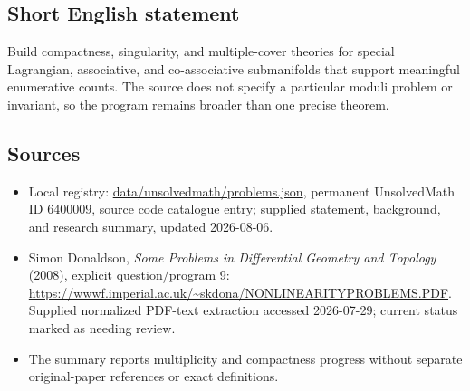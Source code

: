 \documentclass[11pt]{article}
\begin{document}
\subsection{Short English statement}
Build compactness, singularity, and multiple-cover theories for special Lagrangian, associative, and co-associative submanifolds that support meaningful enumerative counts. The source does not specify a particular moduli problem or invariant, so the program remains broader than one precise theorem.
\subsection{Sources}
\begin{itemize}
\item Local registry: \url{data/unsolvedmath/problems.json}, permanent UnsolvedMath ID \(6400009\), source code catalogue entry; supplied statement, background, and research summary, updated 2026-08-06.
\item Simon Donaldson, \emph{Some Problems in Differential Geometry and Topology} (2008), explicit question/program 9: \url{https://wwwf.imperial.ac.uk/~skdona/NONLINEARITYPROBLEMS.PDF}. Supplied normalized PDF-text extraction accessed 2026-07-29; current status marked as needing review.
\item The summary reports multiplicity and compactness progress without separate original-paper references or exact definitions.
\end{itemize}
\end{document}
